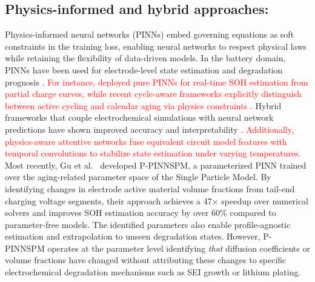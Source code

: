 \documentclass[5p,times,authoryear]{elsarticle}
\begin{document}
\subsection{Physics-informed and hybrid approaches:}
Physics-informed neural networks (PINNs) \citep{raissi2019physics} embed governing equations as soft constraints in the training loss, enabling neural networks to respect physical laws while retaining the flexibility of data-driven models. In the battery domain, PINNs have been used for electrode-level state estimation \citep{li2022physics} and degradation prognosis \citep{wang2024pinn}. \textcolor{red}{For instance, \citet{wang2024pinn} deployed pure PINNs for real-time SOH estimation from partial charge curves, while recent cycle-aware frameworks explicitly distinguish between active cycling and calendar aging via physics constraints \citep{cycleaware2025}.} Hybrid frameworks that couple electrochemical simulations with neural network predictions have shown improved accuracy and interpretability \citep{thelen2022integrating, dawsonelli2018datasci}. \textcolor{red}{Additionally, physics-aware attentive networks \citep{tcn2025} fuse equivalent circuit model features with temporal convolutions to stabilize state estimation under varying temperatures.} Most recently, Gu et al.\ \citep{gu2026realtime} developed P-PINNSPM, a parameterized PINN trained over the aging-related parameter space of the Single Particle Model. By identifying changes in electrode active material volume fractions from tail-end charging voltage segments, their approach achieves a 47$\times$ speedup over numerical solvers and improves SOH estimation accuracy by over 60\% compared to parameter-free models. The identified parameters also enable profile-agnostic estimation and extrapolation to unseen degradation states. However, P-PINNSPM operates at the parameter level identifying \textit{that} diffusion coefficients or volume fractions have changed without attributing these changes to specific electrochemical degradation mechanisms such as SEI growth or lithium plating.
\end{document}

